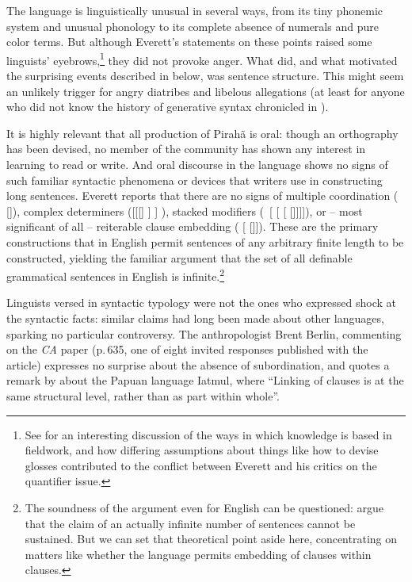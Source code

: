 \documentclass[output=paper,colorlinks,citecolor=brown
]{langscibook}
\begin{document}
The language is linguistically unusual in several ways, from its tiny
phonemic system and unusual phonology to its complete absence of
numerals and pure color terms. But although Everett's statements on
these points raised some linguists' eyebrows,\footnote{%
   See \citet{DobrSchw21} for an interesting discussion of the ways
   in which knowledge is based in fieldwork, and how differing assumptions
   about things like how to devise glosses contributed to the conflict
   between Everett and his critics on the quantifier issue.}
they did not provoke anger. What did, and what motivated the surprising
events described in  below, was sentence structure.
This might seem an unlikely trigger for angry diatribes and libelous
allegations (at least for anyone who did not know the history of
generative syntax chronicled in \citealt{Harris21}).

It is highly relevant that all production of Pirahã is oral:
though an orthography has been devised, no member of the community
has shown any interest in learning to read or write. And oral
discourse in the language shows no signs of such familiar syntactic
phenomena or devices that writers use in constructing long sentences.
Everett reports that there are no signs of multiple coordination
( []),
complex determiners ([[[] ] ]
), stacked modifiers (~[ [
[ []]]]), or -- most significant
of all -- reiterable clause embedding ( [ []]). These are the primary
constructions that in English permit sentences of any arbitrary finite
length to be constructed, yielding the familiar argument that the set
of all definable grammatical sentences in English is
infinite.\footnote{%
   The soundness of the argument even for English can be questioned:
   \citet[115--124]{PullScho10} argue that the
   claim of an actually infinite number of sentences cannot be
   sustained. But we can set that theoretical point aside here,
   concentrating on matters like whether the language permits
   embedding of clauses within clauses.}

\label{page-non-infinite-languages-start}Linguists versed in syntactic typology were not the ones who expressed
shock at the syntactic facts: similar claims had long been made about
other languages, sparking no particular controversy. The anthropologist
Brent Berlin, commenting on the \textit{CA} paper (p.\,635, one of
eight invited responses published with the article) expresses no
surprise about the absence of subordination, and quotes a remark by
\citet[177]{Foley86} about the Papuan language Iatmul, where
``Linking of clauses is at the same structural level, rather than as
part within whole''.
\end{document}
